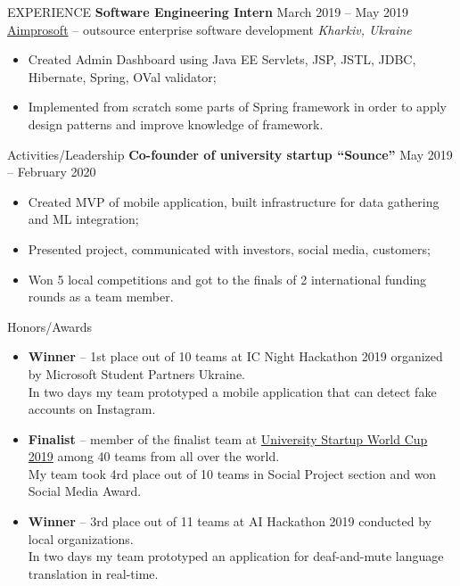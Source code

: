 \documentclass{resume} %
\begin{document}
\begin{rSection}{EXPERIENCE}
\textbf{Software Engineering Intern} \hfill March 2019 -- May 2019\\
\href{{https://www.aimprosoft.com/}}{Aimprosoft} -- outsource enterprise software development \hfill \textit{Kharkiv, Ukraine}
 \begin{itemize}[topsep=2pt, itemsep=7pt,parsep=-5pt]
     \item Created Admin Dashboard using Java EE Servlets, JSP, JSTL, JDBC, Hibernate, Spring, OVal validator;
     \item Implemented from scratch some parts of Spring framework in order to apply design patterns and improve knowledge of framework.
 \end{itemize}
\end{rSection} 

\begin{rSection}{Activities/Leadership} 
\textbf{Co-founder of university startup ``Sounce''} \hfill May 2019 -- February 2020
\begin{itemize}[topsep=2pt, itemsep=7pt,parsep=-5pt]
    \item Created MVP of mobile application, built infrastructure for data gathering and ML integration;
    \item Presented project, communicated with investors, social media, customers;
    \item Won 5 local competitions and got to the finals of 2 international funding rounds as a team member.
\end{itemize} 
\end{rSection}

\begin{rSection}{Honors/Awards} 
\begin{itemize}
    \item\textbf{Winner} -- 1st place out of 10 teams at IC Night Hackathon 2019 organized by Microsoft Student Partners Ukraine.\\ 
    In two days my team prototyped a mobile application that can detect fake accounts on Instagram.
    \item\textbf{Finalist} -- member of the finalist team at  \href{https://venturecup.dk/uswc/}{University Startup World Cup 2019} among 40 teams from all over the world.\\
    My team took 4rd place out of 10 teams in Social Project section and won Social Media Award.
     \item\textbf{Winner} -- 3rd place out of 11 teams at AI Hackathon 2019 conducted by local organizations. \\
     In two days my team prototyped an application for deaf-and-mute language translation in real-time.
\end{itemize}
\end{rSection}
\end{document}
